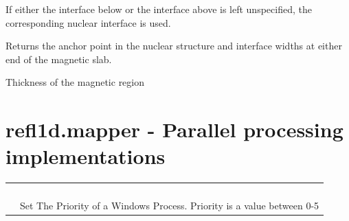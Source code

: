 \documentclass[letterpaper,10pt,english]{sphinxmanual}
\begin{document}
\begin{fulllineitems}
\begin{fulllineitems}
If either the interface below or the interface above is left
unspecified, the corresponding nuclear interface is used.

Returns the anchor point in the nuclear structure and interface
widths at either end of the magnetic slab.

\end{fulllineitems}


\begin{fulllineitems}
\label{api/magnetic:refl1d.magnetic.MagneticTwist.thickness}
Thickness of the magnetic region

\end{fulllineitems}


\begin{fulllineitems}
\label{api/magnetic:refl1d.magnetic.MagneticTwist.thicknessM}
\end{fulllineitems}


\end{fulllineitems}



\section{refl1d.mapper - Parallel processing implementations}
\label{api/mapper::doc}\label{api/mapper:refl1d-mapper-parallel-processing-implementations}
\begin{tabulary}{\linewidth}{LL}
\hline

{\hyperref[api/mapper:refl1d.mapper.AMQPMapper]{}}
 & 

\\

{\hyperref[api/mapper:refl1d.mapper.MPMapper]{}}
 & 

\\

{\hyperref[api/mapper:refl1d.mapper.SerialMapper]{}}
 & 

\\

{\hyperref[api/mapper:refl1d.mapper.nice]{}}
 & 

\\

{\hyperref[api/mapper:refl1d.mapper.setpriority]{}}
 & 
Set The Priority of a Windows Process.  Priority is a value between 0-5
\\
\hline
\end{tabulary}
\end{document}
